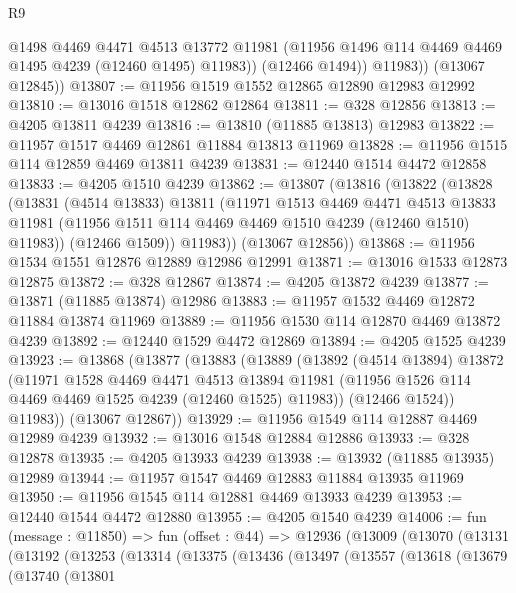 \begin{lexlean}{R9}
\begin{coremodule}
              @1498
              @4469
              @4471
              @4513
              @13772
              @11981
              (@11956 @1496 @114 @4469 @4469 @1495 @4239 (@12460 @1495) @11983))
            (@12466 @1494))
          @11983))
      (@13067 @12845))
@13807 := @11956 @1519 @1552 @12865 @12890 @12983 @12992
@13810 := @13016 @1518 @12862 @12864
@13811 := @328 @12856
@13813 := @4205 @13811 @4239
@13816 := @13810 (@11885 @13813) @12983
@13822 := @11957 @1517 @4469 @12861 @11884 @13813 @11969
@13828 := @11956 @1515 @114 @12859 @4469 @13811 @4239
@13831 := @12440 @1514 @4472 @12858
@13833 := @4205 @1510 @4239
@13862 := @13807
    (@13816
      (@13822
        (@13828
          (@13831
            (@4514 @13833)
            @13811
            (@11971
              @1513
              @4469
              @4471
              @4513
              @13833
              @11981
              (@11956 @1511 @114 @4469 @4469 @1510 @4239 (@12460 @1510) @11983))
            (@12466 @1509))
          @11983))
      (@13067 @12856))
@13868 := @11956 @1534 @1551 @12876 @12889 @12986 @12991
@13871 := @13016 @1533 @12873 @12875
@13872 := @328 @12867
@13874 := @4205 @13872 @4239
@13877 := @13871 (@11885 @13874) @12986
@13883 := @11957 @1532 @4469 @12872 @11884 @13874 @11969
@13889 := @11956 @1530 @114 @12870 @4469 @13872 @4239
@13892 := @12440 @1529 @4472 @12869
@13894 := @4205 @1525 @4239
@13923 := @13868
    (@13877
      (@13883
        (@13889
          (@13892
            (@4514 @13894)
            @13872
            (@11971
              @1528
              @4469
              @4471
              @4513
              @13894
              @11981
              (@11956 @1526 @114 @4469 @4469 @1525 @4239 (@12460 @1525) @11983))
            (@12466 @1524))
          @11983))
      (@13067 @12867))
@13929 := @11956 @1549 @114 @12887 @4469 @12989 @4239
@13932 := @13016 @1548 @12884 @12886
@13933 := @328 @12878
@13935 := @4205 @13933 @4239
@13938 := @13932 (@11885 @13935) @12989
@13944 := @11957 @1547 @4469 @12883 @11884 @13935 @11969
@13950 := @11956 @1545 @114 @12881 @4469 @13933 @4239
@13953 := @12440 @1544 @4472 @12880
@13955 := @4205 @1540 @4239
@14006 := fun (message : @11850) =>
  fun (offset : @44) =>
  @12936
    (@13009
      (@13070
        (@13131
          (@13192
            (@13253
              (@13314
                (@13375
                  (@13436
                    (@13497
                      (@13557
                        (@13618
                          (@13679
                            (@13740
                              (@13801

\end{coremodule}
\end{lexlean}
